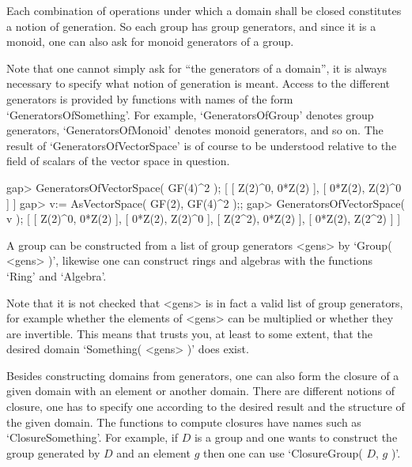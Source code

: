 Each combination of operations under which a domain shall be closed
constitutes a notion of generation.
So each group has group generators, and since it is a monoid,
one can also ask for monoid generators of a group.

Note that one cannot simply ask for ``the generators of a domain'',
it is always necessary to specify what notion of generation is meant.
Access to the different generators is provided by functions with
names of the form `GeneratorsOfSomething'.
For example, `GeneratorsOfGroup' denotes group generators,
`GeneratorsOfMonoid' denotes monoid generators, and so on.
The result of `GeneratorsOfVectorSpace' is of course to be understood
relative to the field of scalars of the vector space in question.

\beginexample
    gap> GeneratorsOfVectorSpace( GF(4)^2 );
    [ [ Z(2)^0, 0*Z(2) ], [ 0*Z(2), Z(2)^0 ] ]
    gap> v:= AsVectorSpace( GF(2), GF(4)^2 );;
    gap> GeneratorsOfVectorSpace( v );
    [ [ Z(2)^0, 0*Z(2) ], [ 0*Z(2), Z(2)^0 ], [ Z(2^2), 0*Z(2) ], 
      [ 0*Z(2), Z(2^2) ] ]
\endexample



A group can be constructed from a list of group generators <gens> by
`Group( <gens> )',
likewise one can construct rings and algebras with the functions `Ring'
and `Algebra'.

Note that it is not checked that <gens> is in fact a valid list of group
generators, for example whether the elements of <gens> can be multiplied
or whether they are invertible.
This means that {\GAP} trusts you, at least to some extent, that the
desired domain `Something( <gens> )' does exist.



Besides constructing domains from generators, one can also form the
closure of a given domain with an element or another domain.
There are different notions of closure, one has to specify one
according to the desired result and the structure of the given domain.
The functions to compute closures have names such as
`ClosureSomething'.
For example, if $D$ is a group and one wants to construct the group
generated by $D$ and an element $g$ then one can use
`ClosureGroup( $D$, $g$ )'.



